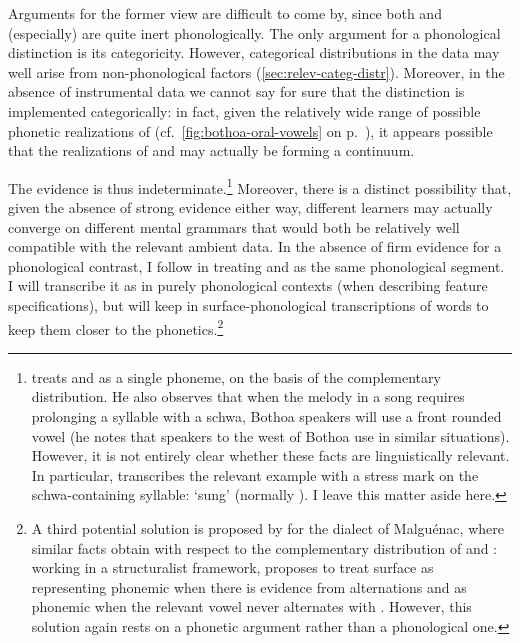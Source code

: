 Arguments for the former view are difficult to come by, since both  and (especially)  are quite inert phonologically. The only argument for a phonological distinction is its categoricity. However, categorical distributions in the data may well arise from non-phonological factors (\cref{sec:relev-categ-distr}). Moreover, in the absence of instrumental data we cannot  say for sure that the distinction is implemented categorically: in fact, given the relatively wide range of possible phonetic realizations of \ipa{[ə]} (cf.\ \cref{fig:bothoa-oral-vowels} on p.~\pageref{fig:bothoa-oral-vowels}), it appears possible that the realizations of \ipa{[ø]} and \ipa{[ə]} may actually be forming a continuum.

The evidence is thus indeterminate.\footnote{\citet[p.~108]{humphreys95:_phonol_bothoa_saint_nicol_pelem} treats \ipa{[ø]} and \ipa{[ə]} as a single phoneme, on the basis of the complementary distribution. He also observes that when the melody in a song requires prolonging a syllable with a schwa, Bothoa speakers will use a front rounded vowel (he notes that speakers to the west of Bothoa use \ipa{[ɛ]} in similar situations). However, it is not entirely clear whether these facts are linguistically relevant. In particular, \citet{humphreys95:_phonol_bothoa_saint_nicol_pelem} transcribes the relevant example with a stress mark on the schwa-containing syllable:  `sung' (normally ). I leave this matter aside here.} Moreover, there is a distinct possibility that, given the absence of strong evidence either way, different learners may actually converge on different mental grammars that would both be relatively well compatible with the relevant ambient data. In the absence of firm evidence for a phonological contrast, I follow \citet{humphreys95:_phonol_bothoa_saint_nicol_pelem} in treating \ipa{[ə]} and \ipa{[ø]} as the same phonological segment. I will transcribe it as \ipa{[ə]} in purely phonological contexts (\eg when describing feature specifications), but will keep \ipa{[ø]} in surface-phonological transcriptions of words to keep them closer to the phonetics.\footnote{A third potential solution is proposed by \citet{le00:_le_malguen} for the dialect of Malguénac, where similar facts obtain with respect to the complementary distribution of  and : working in a structuralist framework, \citeauthor{le00:_le_malguen} proposes to treat surface \ipa{[ə]} as representing phonemic  when there is evidence from alternations and as phonemic  when the relevant vowel never alternates with \ipa{[œ]}. However, this solution again rests on a phonetic argument rather than a phonological one.}


